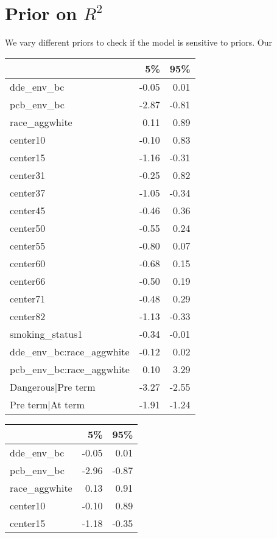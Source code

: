 \documentclass[wcp]{jmlr}%
\begin{document}
\section{Prior on $R^2$}
We vary different priors to check if the model is sensitive to priors. Our 

 \begin{table}
 	\footnotesize
 	\begin{tabular}[t]{l|r|r}
		\hline
		  & 5\% & 95\%\\
		\hline
		dde\_env\_bc & -0.05 & 0.01\\
		\hline
		pcb\_env\_bc & -2.87 & -0.81\\
		\hline
		race\_aggwhite & 0.11 & 0.89\\
		\hline
		center10 & -0.10 & 0.83\\
		\hline
		center15 & -1.16 & -0.31\\
		\hline
		center31 & -0.25 & 0.82\\
		\hline
		center37 & -1.05 & -0.34\\
		\hline
		center45 & -0.46 & 0.36\\
		\hline
		center50 & -0.55 & 0.24\\
		\hline
		center55 & -0.80 & 0.07\\
		\hline
		center60 & -0.68 & 0.15\\
		\hline
		center66 & -0.50 & 0.19\\
		\hline
		center71 & -0.48 & 0.29\\
		\hline
		center82 & -1.13 & -0.33\\
		\hline
		smoking\_status1 & -0.34 & -0.01\\
		\hline
		dde\_env\_bc:race\_aggwhite & -0.12 & 0.02\\
		\hline
		pcb\_env\_bc:race\_aggwhite & 0.10 & 3.29\\
		\hline
		Dangerous|Pre term & -3.27 & -2.55\\
		\hline
		Pre term|At term & -1.91 & -1.24\\
		\hline
		\end{tabular}
 	\hfill
	    \begin{tabular}[t]{l|r|r}
	\hline
	  & 5\% & 95\%\\
	\hline
	dde\_env\_bc & -0.05 & 0.01\\
	\hline
	pcb\_env\_bc & -2.96 & -0.87\\
	\hline
	race\_aggwhite & 0.13 & 0.91\\
	\hline
	center10 & -0.10 & 0.89\\
	\hline
	center15 & -1.18 & -0.35\\

\end{tabular}
\end{table}
\end{document}
